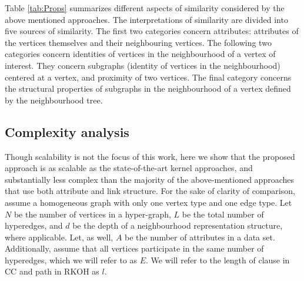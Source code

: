 Table \ref{tab:Props} summarizes different aspects of similarity considered by the above mentioned approaches.
The interpretations of similarity are divided into five sources of similarity.
The first two categories concern attributes: attributes of the vertices themselves and their neighbouring vertices.
The following two categories concern identities of vertices in the neighbourhood of a vertex of interest.
They concern subgraphs (identity of vertices in the neighbourhood) centered at a vertex, and proximity of two vertices.
The final category concerns the structural properties of subgraphs in the neighbourhood of a vertex defined by the neighbourhood tree.


\subsection{Complexity analysis}

Though scalability is not the focus of this work, here we show that the proposed approach is as scalable as the state-of-the-art kernel approaches, and substantially less complex than the majority of the above-mentioned approaches that use both attribute and link structure.
For the sake of clarity of comparison, assume a homogeneous graph with only one vertex type and one edge type.
Let $N$ be the number of vertices in a hyper-graph, $L$ be the total number of hyperedges, and $d$ be the depth of a neighbourhood representation structure, where applicable.
Let, as well, $A$ be the number of attributes in a data set.
Additionally, assume that all vertices participate in the same number of hyperedges, which we will refer to as $E$. 
We will refer to the length of clause in CC and path in RKOH as $l$.



